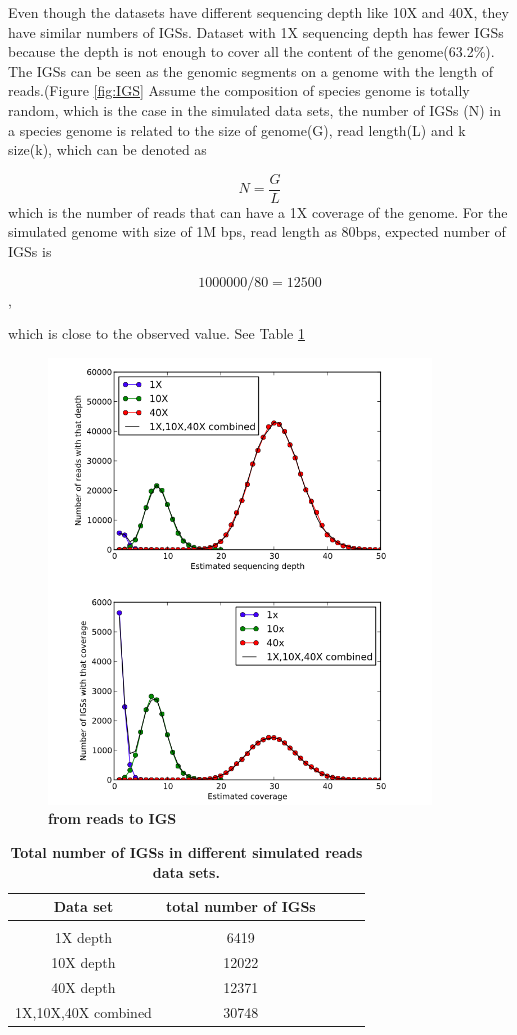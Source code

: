 Even though the datasets have different sequencing depth like 10X and 40X, 
they have similar numbers of IGSs. Dataset with 1X sequencing depth has fewer 
IGSs because the depth is not enough to cover all the content of the 
genome(63.2\%). The IGSs can be seen as the
genomic segments on a genome with the length of reads.(Figure \ref{fig:IGS}  
Assume the composition of species 
genome is totally random, which is the case in the simulated data sets, the 
number of IGSs (N) in a species genome is related to the size of genome(G), 
read length(L) and k size(k), which can be denoted as

\[N =\frac{G}{L}  \]
which is the number of reads that can have a 1X coverage of the genome.
For the simulated genome with size of 1M bps, read length as 80bps, expected 
number of IGSs is 

\[1000000/80 = 12500 \], 

which is close to the observed value. See Table \ref{table:IGSs}


\begin{figure}[!ht]
\centerline{\includegraphics[width=4in]{./figures/from_reads_to_IGS.png}}
\caption{\bf from reads to IGS}
\label{fig:reads_to_IGS}
\end{figure}

\begin{table}[!ht]
\caption{
\bf{Total number of IGSs in different simulated reads data sets.}
}
\begin{tabular}{ |c | c |c| c|c| }
Data set & total number of IGSs \\
\hline \\
1X depth                   & 6419  \\
10X depth                  & 12022  \\
40X depth                  & 12371 \\
1X,10X,40X combined        & 30748 \\
\end{tabular}
\begin{flushleft}
\end{flushleft}
\label{table:IGSs}
\end{table}


